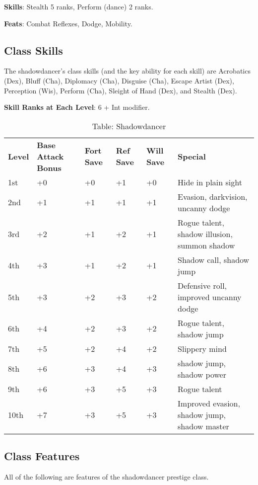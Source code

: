 \textbf{Skills}: Stealth 5 ranks, Perform (dance) 2 ranks.
				
\textbf{Feats}: Combat Reflexes, Dodge, Mobility. 
				
\subsection{Class Skills}

				
The shadowdancer's class skills (and the key ability for each skill) are Acrobatics (Dex), Bluff (Cha), Diplomacy (Cha), Disguise (Cha), Escape Artist (Dex), Perception (Wis), Perform (Cha), Sleight of Hand (Dex), and Stealth (Dex).
				
\textbf{ Skill Ranks at Each Level}: 6 + Int modifier.

\begin{table*}[]
\sffamily
\caption{Table: Shadowdancer}
\begin{tabular}{llllll}
\textbf{Level} & \textbf{Base Attack Bonus} & \textbf{Fort Save} & \textbf{Ref Save} & \textbf{Will Save} & \textbf{Special}\\
1st & +0 & +0 & +1 & +0 & Hide in plain sight\\
2nd & +1 & +1 & +1 & +1 & Evasion, darkvision, uncanny dodge\\
3rd & +2 & +1 & +2 & +1 & Rogue talent, shadow illusion, summon shadow\\
4th & +3 & +1 & +2 & +1 & Shadow call, shadow jump\\
5th & +3 & +2 & +3 & +2 & Defensive roll, improved uncanny dodge\\
6th & +4 & +2 & +3 & +2 & Rogue talent, shadow jump\\
7th & +5 & +2 & +4 & +2 & Slippery mind\\
8th & +6 & +3 & +4 & +3 & shadow jump, shadow power\\
9th & +6 & +3 & +5 & +3 & Rogue talent\\
10th & +7 & +3 & +5 & +3 & Improved evasion, shadow jump, shadow master\\
\end{tabular}
\end{table*}
	
\subsection{Class Features}

				
All of the following are features of the shadowdancer prestige class.
				
